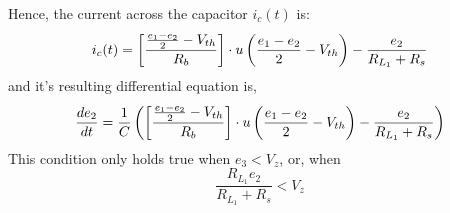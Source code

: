 Hence, the current across the capacitor $i_c(t)$ is:
\begin{equation}
	i_c(t) = \left[\frac{\frac{e_1 - e_2}{2} - V_{th}}{R_b} \right]\cdot u\left(\frac{e_1 - e_2}{2} - V_{th} \right) - \frac{e_2}{R_{L_1} + R_s}
\end{equation}
and it's resulting differential equation is,
\begin{equation}
	\frac{de_2}{dt} = \frac{1}{C}\left(\left[\frac{\frac{e_1 - e_2}{2} - V_{th}}{R_b} \right]\cdot u\left(\frac{e_1 - e_2}{2} - V_{th} \right) - \frac{e_2}{R_{L_1} + R_s} \right)
	\label{eq:resistiveLoad_DiffEq1}
\end{equation}
This condition only holds true when $e_3 < V_z$, or, when
\begin{equation}
	\frac{R_{L_1}e_2}{R_{L_1} + R_s} < V_z
\end{equation}

